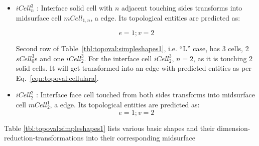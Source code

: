\begin{itemize}
	\item $iCell^{3}_{n}$ : Interface solid cell with $n$ adjacent touching sides transforms into midsurface cell  $mCell_{1,n}$, a edge. Its topological entities are predicted as:

\begin{equation}
e=1;
v=2
\label{eqn:topoval:cellulara}
\end{equation}

Second row of Table~\ref{tbl:topoval:simpleshapes1}, i.e. ``L'' case, has 3 cells, 2 $sCell^{3}_{0}$s and one $ iCell^{3}_{2}$. For the interface cell $ iCell^{3}_{2}$, $n=2$, as it is touching 2 solid cells. It will get transformed into an edge with predicted entities as per Eq.~\ref{eqn:topoval:cellulara}.

	\item  $iCell^{2}_{2}$ :	Interface face cell touched from both sides  transforms into midsurface cell  $mCell^{1}_{2}$, a edge. Its topological entities are predicted as:
\begin{equation}
e=1;
v=2
\label{eqn:topoval:cellularaf}
\end{equation}


\end{itemize}


Table \ref{tbl:topoval:simpleshapes1} lists various basic shapes and their dimension-reduction-transformations into their corresponding midsurface




